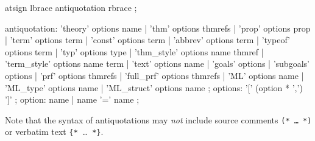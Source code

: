 
\begin{rail}
  atsign lbrace antiquotation rbrace
  ;

  antiquotation:
    'theory' options name |
    'thm' options thmrefs |
    'prop' options prop |
    'term' options term |
    'const' options term |
    'abbrev' options term |
    'typeof' options term |
    'typ' options type |
    'thm\_style' options name thmref |
    'term\_style' options name term |
    'text' options name |
    'goals' options |
    'subgoals' options |
    'prf' options thmrefs |
    'full\_prf' options thmrefs |
    'ML' options name |
    'ML\_type' options name |
    'ML\_struct' options name
  ;
  options: '[' (option * ',') ']'
  ;
  option: name | name '=' name
  ;
\end{rail}

Note that the syntax of antiquotations may \emph{not} include source comments
\texttt{(*~\dots~*)} or verbatim text \verb|{*|~\dots~\verb|*}|.

